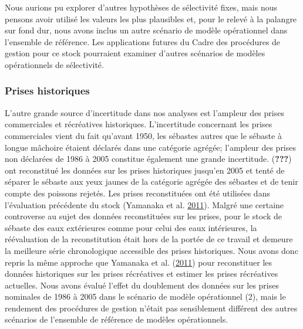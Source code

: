 \documentclass[11pt]{book}
\begin{document}
Nous aurions pu explorer d'autres hypothèses de sélectivité fixes, mais nous pensons avoir utilisé les valeurs les plus plausibles et, pour le relevé à la palangre sur fond dur, nous avons inclus un autre scénario de modèle opérationnel dans l'ensemble de référence. Les applications futures du Cadre des procédures de gestion pour ce stock pourraient examiner d'autres scénarios de modèles opérationnels de sélectivité.

\hypertarget{sec:discussion-uncertainties-catch}{%
\subsubsection{Prises historiques}\label{sec:discussion-uncertainties-catch}}

L'autre grande source d'incertitude dans nos analyses est l'ampleur des prises commerciales et récréatives historiques. L'incertitude concernant les prises commerciales vient du fait qu'avant 1950, les sébastes autres que le sébaste à longue mâchoire étaient déclarés dans une catégorie agrégée; l'ampleur des prises non déclarées de 1986 à 2005 constitue également une grande incertitude. ({\textbf{???}}) ont reconstitué les données sur les prises historiques jusqu'en 2005 et tenté de séparer le sébaste aux yeux jaunes de la catégorie agrégée des sébastes et de tenir compte des poissons rejetés. Les prises reconstituées ont été utilisées dans l'évaluation précédente du stock (Yamanaka et al. \protect\hyperlink{ref-yamanaka2011}{2011}). Malgré une certaine controverse au sujet des données reconstituées sur les prises, pour le stock de sébaste des eaux extérieures comme pour celui des eaux intérieures, la réévaluation de la reconstitution était hors de la portée de ce travail et demeure la meilleure série chronologique accessible des prises historiques. Nous avons donc repris la même approche que Yamanaka et al. (\protect\hyperlink{ref-yamanaka2011}{2011}) pour reconstituer les données historiques sur les prises récréatives et estimer les prises récréatives actuelles. Nous avons évalué l'effet du doublement des données sur les prises nominales de 1986 à 2005 dans le scénario de modèle opérationnel (2), mais le rendement des procédures de gestion n'était pas sensiblement différent des autres scénarios de l'ensemble de référence de modèles opérationnels.
\end{document}
